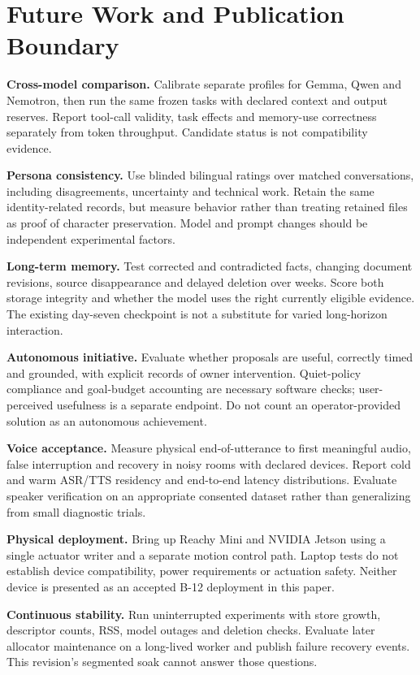 \documentclass[11pt]{article}
\begin{document}
\section{Future Work and Publication Boundary}
\textbf{Cross-model comparison.} Calibrate separate profiles for Gemma, Qwen and Nemotron, then run the same frozen tasks with declared context and output reserves. Report tool-call validity, task effects and memory-use correctness separately from token throughput. Candidate status is not compatibility evidence.

\textbf{Persona consistency.} Use blinded bilingual ratings over matched conversations, including disagreements, uncertainty and technical work. Retain the same identity-related records, but measure behavior rather than treating retained files as proof of character preservation. Model and prompt changes should be independent experimental factors.

\textbf{Long-term memory.} Test corrected and contradicted facts, changing document revisions, source disappearance and delayed deletion over weeks. Score both storage integrity and whether the model uses the right currently eligible evidence. The existing day-seven checkpoint is not a substitute for varied long-horizon interaction.

\textbf{Autonomous initiative.} Evaluate whether proposals are useful, correctly timed and grounded, with explicit records of owner intervention. Quiet-policy compliance and goal-budget accounting are necessary software checks; user-perceived usefulness is a separate endpoint. Do not count an operator-provided solution as an autonomous achievement.

\textbf{Voice acceptance.} Measure physical end-of-utterance to first meaningful audio, false interruption and recovery in noisy rooms with declared devices. Report cold and warm ASR/TTS residency and end-to-end latency distributions. Evaluate speaker verification on an appropriate consented dataset rather than generalizing from small diagnostic trials.

\textbf{Physical deployment.} Bring up Reachy Mini and NVIDIA Jetson using a single actuator writer and a separate motion control path. Laptop tests do not establish device compatibility, power requirements or actuation safety. Neither device is presented as an accepted B-12 deployment in this paper.

\textbf{Continuous stability.} Run uninterrupted experiments with store growth, descriptor counts, RSS, model outages and deletion checks. Evaluate later allocator maintenance on a long-lived worker and publish failure recovery events. This revision's segmented soak cannot answer those questions.
\end{document}
